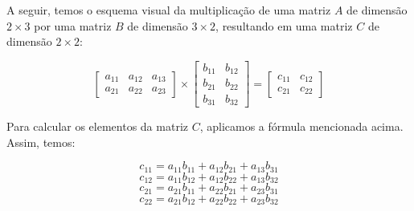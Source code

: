\documentclass[12pt]{article}
\begin{document}
A seguir, temos o esquema visual da multiplicação de uma matriz \(A\) de dimensão \(2 \times 3\) por uma matriz \(B\) de dimensão \(3 \times 2\), resultando em uma matriz \(C\) de dimensão \(2 \times 2\):

\[
\begin{bmatrix}
a_{11} & a_{12} & a_{13} \\
a_{21} & a_{22} & a_{23}
\end{bmatrix}
\times
\begin{bmatrix}
b_{11} & b_{12} \\
b_{21} & b_{22} \\
b_{31} & b_{32}
\end{bmatrix}
=
\begin{bmatrix}
c_{11} & c_{12} \\
c_{21} & c_{22}
\end{bmatrix}
\]


Para calcular os elementos da matriz \(C\), aplicamos a fórmula mencionada acima. Assim, temos:

\[
c_{11} = a_{11}b_{11} + a_{12}b_{21} + a_{13}b_{31}
\]
\[
c_{12} = a_{11}b_{12} + a_{12}b_{22} + a_{13}b_{32}
\]
\[
c_{21} = a_{21}b_{11} + a_{22}b_{21} + a_{23}b_{31}
\]
\[
c_{22} = a_{21}b_{12} + a_{22}b_{22} + a_{23}b_{32}
\]
\end{document}
